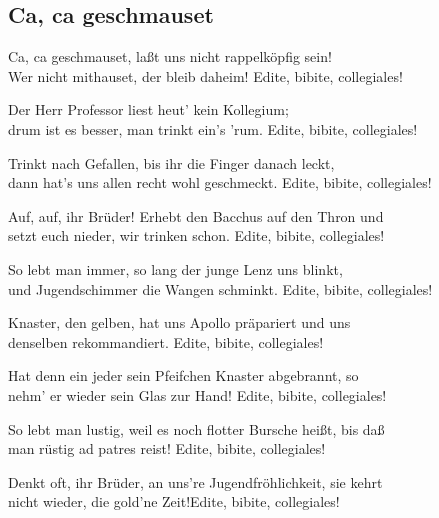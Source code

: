
\subsection*{Ca, ca geschmauset}
%

\thestrophe Ca, ca geschmauset, laßt uns nicht rappelköpfig sein! \\
Wer nicht mithauset, der bleib daheim! Edite, bibite, collegiales! \\

\thestrophe Der Herr Professor liest heut' kein Kollegium; \\
drum ist es besser, man trinkt ein's 'rum. Edite, bibite, collegiales! \\

\thestrophe Trinkt nach Gefallen, bis ihr die Finger danach leckt, \\
dann hat's uns allen recht wohl geschmeckt. Edite, bibite, collegiales! \\

\thestrophe Auf, auf, ihr Brüder! Erhebt den Bacchus auf den Thron und \\
setzt euch nieder, wir trinken schon. Edite, bibite, collegiales! \\

\thestrophe So lebt man immer, so lang der junge Lenz uns blinkt, \\
und Jugendschimmer die Wangen schminkt. Edite, bibite, collegiales! \\

\thestrophe Knaster, den gelben, hat uns Apollo präpariert und uns \\
denselben rekommandiert. Edite, bibite, collegiales! \\

\thestrophe Hat denn ein jeder sein Pfeifchen Knaster abgebrannt, so \\
nehm' er wieder sein Glas zur Hand! Edite, bibite, collegiales! \\

\thestrophe So lebt man lustig, weil es noch flotter Bursche heißt, bis daß \\
man rüstig ad patres reist! Edite, bibite, collegiales! \\

\thestrophe Denkt oft, ihr Brüder, an uns're Jugendfröhlichkeit, sie kehrt \\
nicht wieder, die gold'ne Zeit!Edite, bibite, collegiales! \\
